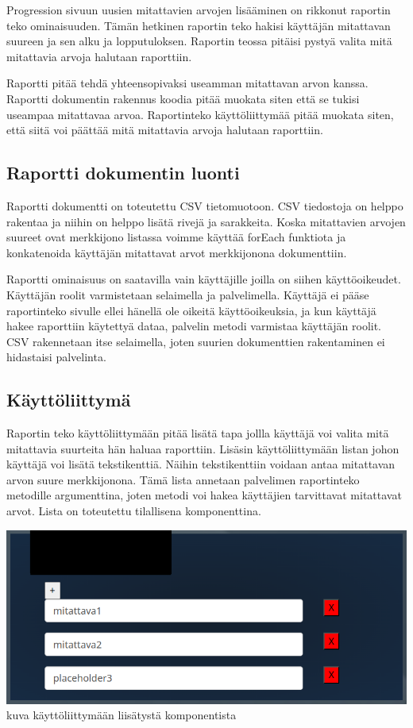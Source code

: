 


Progression sivuun uusien mitattavien arvojen lisääminen on rikkonut raportin teko ominaisuuden.
Tämän hetkinen raportin teko hakisi käyttäjän mitattavan suureen ja sen alku ja lopputuloksen.
Raportin teossa pitäisi pystyä valita mitä mitattavia arvoja halutaan raporttiin.
\medskip


Raportti pitää tehdä yhteensopivaksi useamman mitattavan arvon kanssa.
Raportti dokumentin rakennus koodia pitää muokata siten että se tukisi useampaa mitattavaa arvoa.
Raportinteko käyttöliittymää pitää muokata siten, että siitä voi päättää mitä mitattavia arvoja halutaan raporttiin.


\subsection*{Raportti dokumentin luonti}

Raportti dokumentti on toteutettu CSV tietomuotoon. 
CSV tiedostoja on helppo rakentaa ja niihin on helppo lisätä rivejä ja sarakkeita.
Koska mitattavien arvojen suureet ovat merkkijono listassa voimme käyttää forEach funktiota ja konkatenoida käyttäjän mitattavat arvot merkkijonona dokumenttiin.
\medskip


Raportti ominaisuus on saatavilla vain käyttäjille joilla on siihen käyttöoikeudet.
Käyttäjän roolit varmistetaan selaimella ja palvelimella.
Käyttäjä ei pääse raportinteko sivulle ellei hänellä ole oikeitä käyttöoikeuksia,
ja kun käyttäjä hakee raporttiin käytettyä dataa, palvelin metodi varmistaa käyttäjän roolit.
CSV rakennetaan itse selaimella, joten suurien dokumenttien rakentaminen ei hidastaisi palvelinta.




\subsection*{Käyttöliittymä}


Raportin teko käyttöliittymään pitää lisätä tapa jollla käyttäjä voi valita mitä mitattavia suurteita hän haluaa raporttiin.
Lisäsin käyttöliittymään listan johon käyttäjä voi lisätä tekstikenttiä.
Näihin tekstikenttiin voidaan antaa mitattavan arvon suure merkkijonona. 
Tämä lista annetaan palvelimen raportinteko metodille argumenttina, joten metodi voi hakea käyttäjien tarvittavat mitattavat arvot.
Lista on toteutettu tilallisena komponenttina.



\bigskip
\includegraphics[width=15cm]{src/public/measutableEdited.png}\\
kuva käyttöliittymään liisätystä komponentista
\medskip




